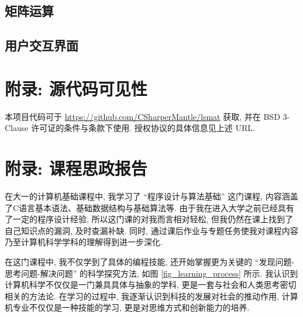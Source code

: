 



\subsection{矩阵运算}





\subsection{用户交互界面}



\newpage

\section{附录: 源代码可见性}
\label{appendix_source_code}

本项目代码可于 \url{https://github.com/CSharperMantle/lsmat} 获取, 并在 BSD 3-Clause 许可证的条件与条款下使用. 授权协议的具体信息见上述 URL.

\newpage

\section{附录: 课程思政报告}
\label{appendix_ideology}

在大一的计算机基础课程中, 我学习了 “程序设计与算法基础” 这门课程, 内容涵盖了C语言基本语法、基础数据结构与基础算法等. 由于我在进入大学之前已经具有了一定的程序设计经验, 所以这门课的对我而言相对轻松, 但我仍然在课上找到了自己知识点的漏洞, 及时查漏补缺. 同时, 通过课后作业与专题任务使我对课程内容乃至计算机科学学科的理解得到进一步深化.

在这门课程中, 我不仅学到了具体的编程技能, 还开始掌握更为关键的 “发现问题-思考问题-解决问题” 的科学探究方法, 如图 \ref{fig_learning_process} 所示. 我认识到计算机科学不仅仅是一门兼具具体与抽象的学科, 更是一套与社会和人类思考密切相关的方法论. 在学习的过程中, 我逐渐认识到科技的发展对社会的推动作用, 计算机专业不仅仅是一种技能的学习, 更是对思维方式和创新能力的培养.

